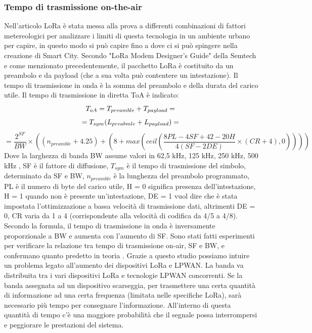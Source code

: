 \documentclass[a4paper]{report} %
\begin{document}
\subsubsection{Tempo di trasmissione on-the-air}
Nell'articolo \cite{art:rif.44} LoRa è stata messa alla prova a differenti combinazioni di fattori metereologici per analizzare i limiti di questa tecnologia in un ambiente urbano per capire, in questo modo si può capire fino a dove ci si può spingere nella creazione di Smart City. Secondo "LoRa Modem Designer’s Guide" della Semtech e come menzionato precedentemente, il pacchetto LoRa è costituito da un preambolo e da payload (che a sua volta può contentere un intestazione). Il tempo di trasmissione in onda è la somma del preambolo e della durata del carico utile. Il tempo di trasmissione in diretta ToA è indicato:
\begin{equation}
T_{oA} = T_{preamble} + T_{payload} = \\
\end{equation}
\begin{equation}
= T_{sym}(L_{preabmle}+L_{payload}) = \\
\end{equation}
\begin{equation}
= \frac{2^{SF}}{BW}\times((n_{preamble}+4.25)+(8+max(ceil(\frac{8PL-4SF+42-20H}{4(SF-2DE)}\times(CR+4),0))))
\end{equation}
Dove la larghezza di banda BW assume valori in {62,5 kHz, 125 kHz, 250 kHz, 500 kHz }, SF è il fattore di diffusione, $T_{sym}$ è il tempo di trasmissione del simbolo, determinato da SF e BW, $n_{preamble}$ è la lunghezza del preambolo programmato, PL è il numero di byte del carico utile, H = 0 significa presenza dell'intestazione, H = 1 quando non è presente un'intestazione, DE = 1 vuol dire che è stata impostata l'ottimizzazione a bassa velocità di trasmissione dati, altrimenti DE = 0, CR varia da 1 a 4 (corrispondente alla velocità di codifica da 4/5 a 4/8). Secondo la formula, il tempo di trasmissione in onda è inversamente proporzionale a BW e aumenta con l'aumento di SF. Sono stati fatti esperimenti per verificare la relazione tra tempo di trasmissione on-air, SF e BW, e confermano quanto predetto in teoria \cite{art:rif.44}.
Grazie a questo studio possiamo intuire un problema legato all'aumento dei dispositivi LoRa e LPWAN. La banda va distribuita tra i vari dispositivi LoRa e tecnologie LPWAN concorrenti. Se la banda assegnata ad un dispositivo scarseggia, per trasmettere una certa quantità di informazione ad una certa frequenza (limitata nelle specifiche LoRa), sarà necessario più tempo per consegnare l'informazione. All'interno di questa quantità di tempo c'è una maggiore probabilità che il segnale possa interrompersi e peggiorare le prestazioni del sistema. 
\end{document}
